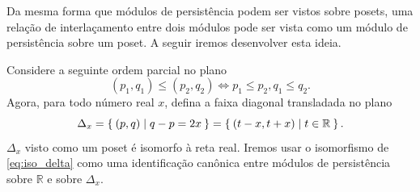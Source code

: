 Da mesma forma que módulos de persistência podem ser vistos sobre posets, uma relação de 
interlaçamento entre dois módulos pode ser vista como um módulo de persistência sobre um poset. A seguir
iremos desenvolver esta ideia. 

Considere a seguinte ordem parcial no plano
\begin{equation*}
    (p_1, q_1) \leq (p_2, q_2) \iff p_1 \leq p_2, q_1 \leq q_2.
\end{equation*}
Agora, para todo número real $x$, defina a faixa diagonal transladada no plano
\begin{equation}\label{eq:iso_delta}
    \Delta_x = \Set{(p,q) | q-p = 2x} = \Set{(t-x, t+x) | t \in \mathbb{R}}.
\end{equation}
$\Delta_x$ visto como um poset é isomorfo à reta real. Iremos usar o isomorfismo de
\eqref{eq:iso_delta} como uma identificação canônica entre módulos de persistência
sobre $\mathbb{R}$ e sobre $\Delta_x$. 

